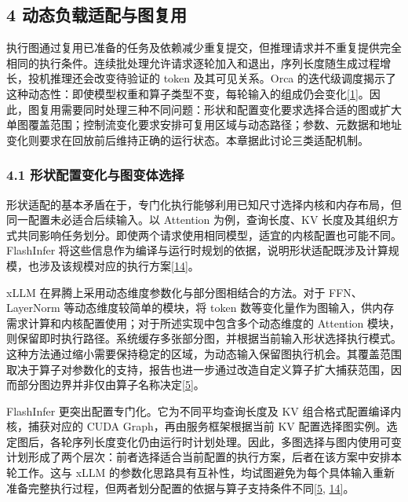 \documentclass[UTF8,11pt,fontset=windows]{ctexart}
\begin{document}
\hypertarget{section-4}{%
\subsection{\texorpdfstring{\textbf{4 动态负载适配与图复用}}{4 动态负载适配与图复用}}\label{section-4}}

执行图通过复用已准备的任务及依赖减少重复提交，但推理请求并不重复提供完全相同的执行条件。连续批处理允许请求逐轮加入和退出，序列长度随生成过程增长，投机推理还会改变待验证的 token 及其可见关系。Orca 的迭代级调度揭示了这种动态性：即使模型权重和算子类型不变，每轮输入的组成仍会变化\protect\hyperlink{ref-1}{{[}1{]}}。因此，图复用需要同时处理三种不同问题：形状和配置变化要求选择合适的图或扩大单图覆盖范围；控制流变化要求安排可复用区域与动态路径；参数、元数据和地址变化则要求在回放前后维持正确的运行状态。本章据此讨论三类适配机制。

\hypertarget{section-4-1}{%
\subsubsection{\texorpdfstring{\textbf{4.1 形状配置变化与图变体选择}}{4.1 形状配置变化与图变体选择}}\label{section-4-1}}

形状适配的基本矛盾在于，专门化执行能够利用已知尺寸选择内核和内存布局，但同一配置未必适合后续输入。以 Attention 为例，查询长度、KV 长度及其组织方式共同影响任务划分。即使两个请求使用相同模型，适宜的内核配置也可能不同。FlashInfer 将这些信息作为编译与运行时规划的依据，说明形状适配既涉及计算规模，也涉及该规模对应的执行方案\protect\hyperlink{ref-14}{{[}14{]}}。

xLLM 在昇腾上采用动态维度参数化与部分图相结合的方法。对于 FFN、LayerNorm 等动态维度较简单的模块，将 token 数等变化量作为图输入，供内存需求计算和内核配置使用；对于所述实现中包含多个动态维度的 Attention 模块，则保留即时执行路径。系统缓存多张部分图，并根据当前输入形状选择执行模式。这种方法通过缩小需要保持稳定的区域，为动态输入保留图执行机会。其覆盖范围取决于算子对参数化的支持，报告也进一步通过改造自定义算子扩大捕获范围，因而部分图边界并非仅由算子名称决定\protect\hyperlink{ref-5}{{[}5{]}}。

FlashInfer 更突出配置专门化。它为不同平均查询长度及 KV 组合格式配置编译内核，捕获对应的 CUDA Graph，再由服务框架根据当前 KV 配置选择图实例。选定图后，各轮序列长度变化仍由运行时计划处理。因此，多图选择与图内使用可变计划形成了两个层次：前者选择适合当前配置的执行方案，后者在该方案中安排本轮工作。这与 xLLM 的参数化思路具有互补性，均试图避免为每个具体输入重新准备完整执行过程，但两者划分配置的依据与算子支持条件不同\protect\hyperlink{ref-5}{{[}5}, \protect\hyperlink{ref-14}{14{]}}。
\end{document}
